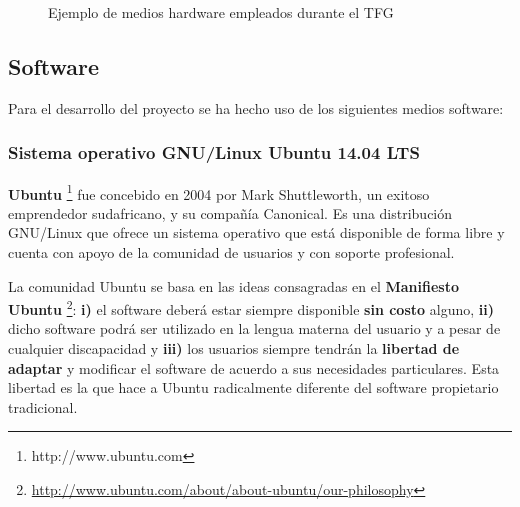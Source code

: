 \begin{figure}[!h]
\begin{center}
\caption[Ejemplo de medios hardware empleados durante el \acs{TFG}]{Ejemplo de medios hardware empleados durante el \acs{TFG}}
\label{fig:hardware}
\end{center}
\end{figure}

\clearpage

\subsection{Software}
\label{sec:software}

Para el desarrollo del proyecto se ha hecho uso de los siguientes medios software:

\subsubsection{Sistema operativo \acs{GNU}/Linux Ubuntu 14.04 \acs{LTS}}
\label{sec:ubuntu}

\textbf{Ubuntu} \footnote{http://www.ubuntu.com} fue concebido en 2004 por Mark Shuttleworth, un exitoso emprendedor sudafricano, y su compañía Canonical. Es una distribución \acs{GNU}/Linux que ofrece un sistema operativo que está disponible de forma libre y cuenta con apoyo de la comunidad de usuarios y con soporte profesional.

La comunidad Ubuntu se basa en las ideas consagradas en el \textbf{Manifiesto Ubuntu} \footnote{\url{http://www.ubuntu.com/about/about-ubuntu/our-philosophy}}: \textbf{i)} el software deberá estar siempre disponible \textbf{sin costo} alguno, \textbf{ii)} dicho software podrá ser utilizado en la lengua materna del usuario y a pesar de cualquier discapacidad y \textbf{iii)} los usuarios siempre tendrán la \textbf{libertad de adaptar} y modificar el software de acuerdo a sus necesidades particulares. Esta libertad es la que hace a Ubuntu radicalmente diferente del software propietario tradicional.


